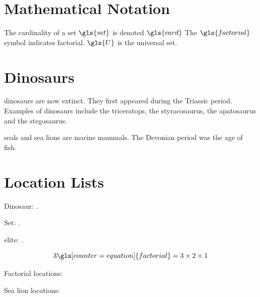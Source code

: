 \documentclass{report}
\begin{document}
\chapter{Mathematical Notation}

The cardinality of a set $\gls{set}$ is denoted $\gls{card}$
The $\gls{factorial}$ symbol indicates factorial.
$\gls{U}$ is the universal set.

\glsaddall[types=main]

\chapter{Dinosaurs}

\Glspl{dinosaur} are now extinct. They first appeared during the
\gls{Triassic} period. Examples of \glspl{dinosaur} include the
\gls{triceratops}, the \gls{styracosaurus}, the \gls{apatosaurus} and the \gls{stegosaurus}.

\Glspl{seal} and \glspl{sea lion} are marine mammals.
The \gls{Devonian} period was the age of fish.

\glsaddall[types=main]

\chapter{Location Lists}

Dinosaur: .

Set: .

\Gls{elite}: .

\begin{equation}
3\gls[counter=equation]{factorial} = 3 \times 2 \times 1
\end{equation}

\newcommand{\myhandler}[4]{%
  Prefix: #1.
  Counter: #2.
  Format: #3.
  Value: #4.
  Link: \setentrycounter[#1]{#2}%
  \csuse{#3}{#4}.
  \par
}
\newcommand{\myxrhandler}[2][]{XR (#1): #2. }

Factorial locations:

Sea lion locations:

\printnoidxglossary[type=main,sort=word]

\printnoidxglossary[type=symbols,sort=use]

\renewcommand*{\glsnamefont}[1]{\textmd{#1}}

\printnoidxglossary[type=index,style=mcolindexgroup,sort=letter]
\end{document}

